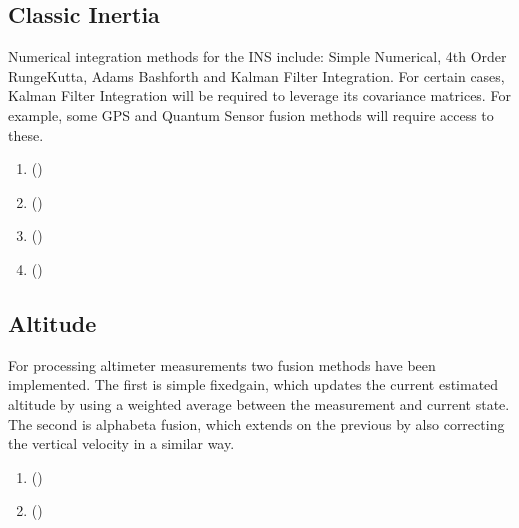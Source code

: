 \documentclass[letterpaper,10pt,english]{sphinxmanual}
\begin{document}
\subsection{Classic Inertia}
\label{\detokenize{usage/fusion:classic-inertia}}
\sphinxAtStartPar
Numerical integration methods for the INS include: Simple Numerical, 4th Order Runge\sphinxhyphen{}Kutta, Adams Bashforth and
Kalman Filter Integration. For certain cases, Kalman Filter Integration will be required to leverage its covariance
matrices. For example, some GPS and Quantum Sensor fusion methods will require access to these.
\begin{enumerate}
%
\item {} 
\sphinxAtStartPar
{\hyperref[\detokenize{modules/fusion/ins:ins-py}]{}} ()

\item {} 
\sphinxAtStartPar
{\hyperref[\detokenize{modules/fusion/ins:ins-py}]{}} ()

\item {} 
\sphinxAtStartPar
{\hyperref[\detokenize{modules/fusion/ins:ins-py}]{}} ()

\item {} 
\sphinxAtStartPar
{\hyperref[\detokenize{modules/fusion/ins:ins-py}]{}} ()

\end{enumerate}


\subsection{Altitude}
\label{\detokenize{usage/fusion:altitude}}
\sphinxAtStartPar
For processing altimeter measurements two fusion methods have been implemented. The first is simple fixed\sphinxhyphen{}gain, which
updates the current estimated altitude by using a weighted average between the measurement and current state. The
second is alpha\sphinxhyphen{}beta fusion, which extends on the previous by also correcting the vertical velocity in a similar way.
\begin{enumerate}
%
\item {} 
\sphinxAtStartPar
{\hyperref[\detokenize{modules/measurement/altimeter:altimeter-py}]{}} ()

\item {} 
\sphinxAtStartPar
{\hyperref[\detokenize{modules/measurement/altimeter:altimeter-py}]{}} ()

\end{enumerate}
\end{document}
